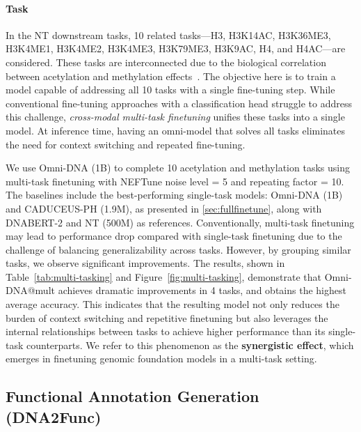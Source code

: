 \paragraph{Task} In the NT downstream tasks, 10 related tasks---H3, H3K14AC, H3K36ME3, H3K4ME1, H3K4ME2, H3K4ME3, H3K79ME3, H3K9AC, H4, and H4AC---are considered. These tasks are interconnected due to the biological correlation between acetylation and methylation effects~\citep{pokholok2005genome}. The objective here is to train a model capable of addressing all 10 tasks with a single fine-tuning step. While conventional fine-tuning approaches with a classification head struggle to address this challenge, \emph{cross-modal multi-task finetuning} unifies these tasks into a single model. At inference time, having an omni-model that solves all tasks eliminates the need for context switching and repeated fine-tuning.

We use Omni-DNA (1B) to complete 10 acetylation and methylation tasks using  multi-task finetuning with NEFTune noise level = 5 and repeating factor = 10. The baselines include the best-performing single-task models: Omni-DNA (1B) and CADUCEUS-PH (1.9M), as presented in \cref{sec:fullfinetune}, along with DNABERT-2 and NT (500M) as references. Conventionally, multi-task finetuning may lead to performance drop compared with single-task finetuning due to the challenge of balancing generalizability across tasks. However, by grouping similar tasks, we observe significant improvements. The results, shown in Table~\ref{tab:multi-tasking} and Figure~\ref{fig:multi-tasking}, demonstrate that Omni-DNA@mult achieves dramatic improvements in 4 tasks, and obtains the highest average accuracy. 
This indicates that the resulting model not only reduces the burden of context switching and repetitive finetuning but also leverages the internal relationships between tasks to achieve higher performance than its single-task counterparts. We refer to this phenomenon as the \textbf{synergistic effect}, which emerges in finetuning genomic foundation models in a multi-task setting.


\subsection{Functional Annotation Generation (DNA2Func)}


